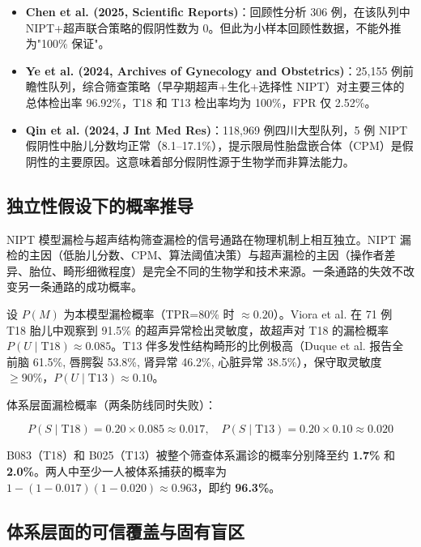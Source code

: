 \documentclass{internal-report}
\begin{document}
\begin{itemize}
    \item \textbf{Chen et al. (2025, Scientific Reports)}\cite{chen2025}：回顾性分析 306 例，在该队列中 NIPT+超声联合策略的假阴性数为 0。但此为小样本回顾性数据，不能外推为"100\% 保证"。
    
    \item \textbf{Ye et al. (2024, Archives of Gynecology and Obstetrics)}\cite{ye2024}：25,155 例前瞻性队列，综合筛查策略（早孕期超声+生化+选择性 NIPT）对主要三体的总体检出率 96.92\%，T18 和 T13 检出率均为 100\%，FPR 仅 2.52\%。
    
    \item \textbf{Qin et al. (2024, J Int Med Res)}\cite{qin2024}：118,969 例四川大型队列，5 例 NIPT 假阴性中胎儿分数均正常（8.1--17.1\%），提示限局性胎盘嵌合体（CPM）是假阴性的主要原因。这意味着部分假阴性源于生物学而非算法能力。
\end{itemize}

\subsection{独立性假设下的概率推导}

NIPT 模型漏检与超声结构筛查漏检的信号通路在物理机制上相互独立。NIPT 漏检的主因（低胎儿分数、CPM、算法阈值决策）与超声漏检的主因（操作者差异、胎位、畸形细微程度）是完全不同的生物学和技术来源。一条通路的失效不改变另一条通路的成功概率。

设 $P(M)$ 为本模型漏检概率（TPR=80\% 时 $\approx 0.20$）。Viora et al.\cite{viora2007} 在 71 例 T18 胎儿中观察到 91.5\% 的超声异常检出灵敏度，故超声对 T18 的漏检概率 $P(U \mid \text{T18}) \approx 0.085$。T13 伴多发性结构畸形的比例极高（Duque et al.\cite{duque2019} 报告全前脑 61.5\%, 唇腭裂 53.8\%, 肾异常 46.2\%, 心脏异常 38.5\%），保守取灵敏度 $\geq 90\%$，$P(U \mid \text{T13}) \approx 0.10$。

体系层面漏检概率（两条防线同时失败）：

\[
P(S \mid \text{T18}) = 0.20 \times 0.085 \approx 0.017, \quad
P(S \mid \text{T13}) = 0.20 \times 0.10 \approx 0.020
\]

B083（T18）和 B025（T13）被整个筛查体系漏诊的概率分别降至约 {\bf 1.7\%} 和 {\bf 2.0\%}。两人中至少一人被体系捕获的概率为 $1 - (1-0.017)(1-0.020) \approx 0.963$，即约 {\bf 96.3\%}。

\subsection{体系层面的可信覆盖与固有盲区}
\end{document}

